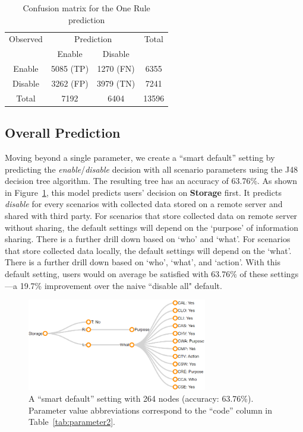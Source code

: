 \begin{table}
	\centering
	\caption{Confusion matrix for the One Rule prediction}
	\label{tab:oner_confusion_matrix}
	\begin{tabular}{c|c|c|c} \hline
		Observed &\multicolumn{2}{c|}{Prediction} & Total\\ \cline{2-3}
		& Enable     & Disable       &  \\ \hline
		Enable   & 5085 (TP) & 1270 (FN)  & 6355   \\ \hline
		Disable    & 3262 (FP)  & 3979 (TN) & 7241  \\ \hline
		Total & 7192     & 6404     & 13596  \\ \hline
	\end{tabular}
\end{table}

\subsection{Overall Prediction}\label{subsection:overall2}
Moving beyond a single parameter, we create a ``smart default'' setting by predicting the \textit{enable}/\textit{disable} decision with all scenario parameters using the J48 decision tree algorithm.
The resulting tree has an accuracy of 63.76\%. As shown in Figure~\ref{fig:smart_default}, this model predicts users' decision on \textbf{Storage} first. It predicts \textit{disable} for every scenarios with collected data stored on a remote server and shared with third party. For scenarios that store collected data on remote server without sharing, the default settings will depend on the `purpose' of information sharing. There is a further drill down based on `who' and `what'. For scenarios that store collected data locally, the default settings will depend on the `what'. There is a further drill down based on `who', `what', and `action'. With this default setting, users would on average be satisfied with 63.76\% of these settings---a 19.7\% improvement over the naive ``disable all" default. 

\begin{figure}
	\centering
	\includegraphics[width=0.7\textwidth]{figures/smartdefault025.png}
	\caption{A ``smart default'' setting with 264 nodes (accuracy: 63.76\%). Parameter value abbreviations correspond to the ``code'' column in Table~\ref{tab:parameter2}.}
	\label{fig:smart_default}
\end{figure}

